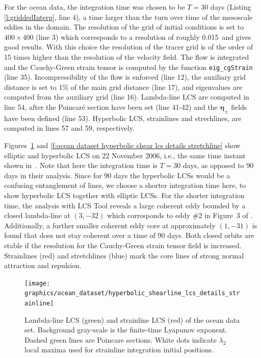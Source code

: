 \documentclass{article}
\begin{document}
For the ocean data, the integration time was chosen to be $T=30$ days (Listing \ref{l:griddedInterp}, line 4), a time larger than the turn over time of the mesoscale eddies in the domain. The resolution of the grid of initial conditions is set to $400\times400$ (line 3) which corresponds to a resolution of roughly 0.015\degree\, and gives good results. With this choice the resolution of the tracer grid is of the order of 15 times higher than the resolution of the velocity field. The flow is integrated and the Cauchy-Green strain tensor is computed by the function \lstinline!eig_cgStrain! (line 35). Incompressibility of the flow is enforced (line 12), the auxiliary grid distance is set to 1\% of the main grid distance (line 17), and eigenvalues are computed from the auxiliary grid (line 16). Lambda-line LCS are computed in line 54, after the Poincar\'e section have been set (line 41-42) and the $\boldsymbol\eta_\pm$ fields have been defined (line 53). Hyperbolic LCS, strainlines and strechlines, are computed in lines 57 and 59, respectively.

Figures~\ref{f:ocean dataset hyperbolic shear lcs details strainline} and \ref{f:ocean dataset hyperbolic shear lcs details stretchline} show elliptic and hyperbolic LCS on 22 November 2006, i.e., the same time instant shown in~\textcite{haller13:_coher_lagran,beron-vera13:_objec_agulh}. Note that here the integration time is $T=30$ days, as opposed to 90 days in their analysis. Since for 90 days the hyperbolic LCSs would be a confusing entanglement of lines, we choose a shorter integration time here, to show hyperbolic LCS together with elliptic LCSs. For the shorter integration time, the analysis with LCS Tool reveals a large coherent eddy bounded by a closed lambda-line at $(3,-32)$ which corresponds to eddy \#2 in Figure~3 of \textcite{beron-vera13:_objec_agulh}. Additionally, a further smaller coherent eddy core at approximately $(1,-31)$ is found that does not stay coherent over a time of 90 days. Both closed orbits are stable if the resolution for the Cauchy-Green strain tensor field is increased. Strainlines (red) and stretchlines (blue) mark the core lines of strong normal attraction and repulsion.

\begin{figure}
\begin{center}
\texttt{[image: graphics/ocean\_dataset/hyperbolic\_shearline\_lcs\_details\_strainline]}
\end{center}
\caption{Lambda-line LCS (green) and strainline LCS (red) of the ocean data set. Background gray-scale is the finite-time Lyapunov exponent. Dashed green lines are Poincare sections. White dots indicate $\lambda_2$ local maxima used for strainline integration initial positions.}
\label{f:ocean dataset hyperbolic shear lcs details strainline}
\end{figure}
\end{document}
